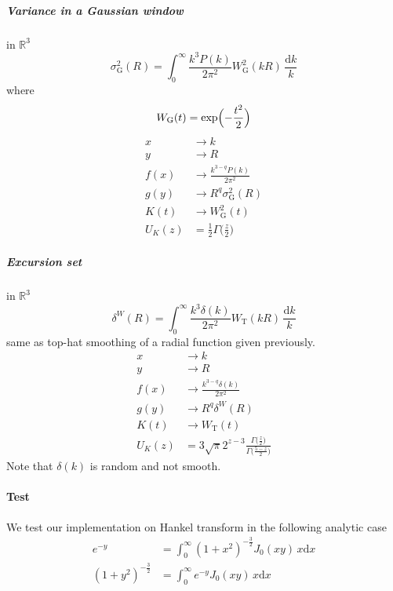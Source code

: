 \documentclass{article}
\renewcommand{\d}{\mathrm{d}}
\newcommand{\Mellin}{U}
\newcommand{\Tophat}{\textrm{T}}
\newcommand{\Gauss}{\textrm{G}}
\begin{document}
\subparagraph{Variance in a Gaussian window}
in $\mathbb{R}^3$
\begin{equation}
    \sigma_\Gauss^2(R) = \int_0^\infty \frac{k^3P(k)}{2\pi^2} W_\Gauss^2(kR) \,\frac{\d k}k
\end{equation}
where
\begin{equation}
    W_\Gauss(t) = \exp\Bigl(-\frac{t^2}2\Bigr)
\end{equation}
\begin{align}
    x &\to k  \\
    y &\to R  \\
    f(x) &\to \frac{k^{3-q}P(k)}{2\pi^2}  \\
    g(y) &\to R^q \sigma_\Gauss^2(R)  \\
    K(t) &\to W_\Gauss^2(t)  \\
    \Mellin_K(z) &= \frac12 \Gamma\bigl(\frac{z}2\bigr)
\end{align}


\subparagraph{Excursion set}
in $\mathbb{R}^3$
\begin{equation}
    \delta^W(R) = \int_0^\infty \frac{k^3\delta(k)}{2\pi^2} W_\Tophat(kR) \,\frac{\d k}k
\end{equation}
same as top-hat smoothing of a radial function given previously.
\begin{align}
    x &\to k  \\
    y &\to R  \\
    f(x) &\to \frac{k^{3-q}\delta(k)}{2\pi^2}  \\
    g(y) &\to R^q \delta^W(R)  \\
    K(t) &\to W_\Tophat(t)  \\
    \Mellin_K(z) &= 3\sqrt\pi 2^{z-3}
            \frac{\Gamma\bigl(\frac{z}2\bigr)}{\Gamma\bigl(\frac{5-z}2\bigr)}
\end{align}
Note that $\delta(k)$ is random and not smooth.


\paragraph{Test}
We test our implementation on Hankel transform in the following analytic case
\begin{align}
    e^{-y} &= \int_0^\infty (1+x^2)^{-\frac32} J_0(xy) \,x\d x  \\
    (1+y^2)^{-\frac32} &= \int_0^\infty e^{-y} J_0(xy) \,x\d x
\end{align}
\end{document}
